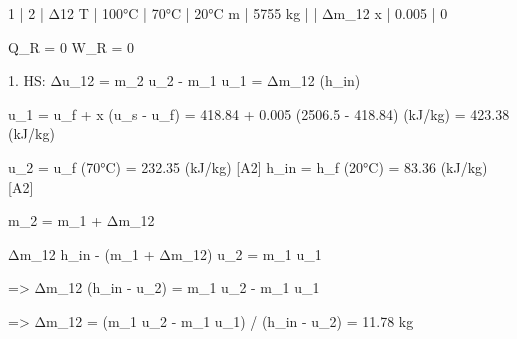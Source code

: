 1 | 2 | Δ12  
T | 100°C | 70°C | 20°C  
m | 5755 kg |   | Δm_12  
x | 0.005 | 0  

Q_R = 0  
W_R = 0  

1. HS:  
Δu_12 = m_2 u_2 - m_1 u_1 = Δm_12 (h_in)  

u_1 = u_f + x (u_s - u_f) = 418.84 + 0.005 (2506.5 - 418.84) (kJ/kg)  
= 423.38 (kJ/kg)  

u_2 = u_f (70°C) = 232.35 (kJ/kg) [A2]  
h_in = h_f (20°C) = 83.36 (kJ/kg) [A2]  

m_2 = m_1 + Δm_12  

Δm_12 h_in - (m_1 + Δm_12) u_2 = m_1 u_1  

=> Δm_12 (h_in - u_2) = m_1 u_2 - m_1 u_1  

=> Δm_12 = (m_1 u_2 - m_1 u_1) / (h_in - u_2) = 11.78 kg